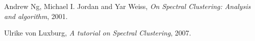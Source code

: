 \documentclass[12pt, a4paper]{article}
\begin{document}
\begin{thebibliography}{2}

  Andrew Ng, Michael I. Jordan and Yar Weiss,
  \emph{On Spectral Clustering: Analysis and algorithm},
  2001.

  Ulrike von Luxburg,
  \emph{A tutorial on Spectral Clustering},
  2007.

\end{thebibliography}
\end{document}
